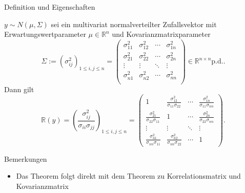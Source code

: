 \documentclass[
  8pt,
  ignorenonframetext,
]{beamer}
\providecommand{\tightlist}{%
  \setlength{\itemsep}{0pt}\setlength{\parskip}{0pt}}
\begin{document}
\begin{frame}{Definition und Eigenschaften}
\protect\hypertarget{definition-und-eigenschaften-4}{}
\footnotesize
\begin{theorem}
\justifying
\normalfont
$y \sim N(\mu,\Sigma)$ sei ein multivariat normalverteilter Zufallsvektor mit
Erwartungswertparameter $\mu \in \mathbb{R}^n$ und Kovarianzmatrixparameter
\begin{equation}
\Sigma
:= \left(\sigma_{ij}^2\right)_{1 \le i,j \le n}
=
\begin{pmatrix}
\sigma_{11}^2  & \sigma_{12}^2  & \cdots &  \sigma_{1n}^2 \\
\sigma_{21}^2  & \sigma_{22}^2  & \cdots &  \sigma_{2n}^2 \\
\vdots         & \vdots         & \ddots &  \vdots        \\
\sigma_{n1}^2  & \sigma_{n2}^2  & \cdots &  \sigma_{nn}^2 \\
\end{pmatrix}
\in \mathbb{R}^{n \times n}\mbox{p.d.}.
\end{equation}
Dann gilt
\begin{equation}
\renewcommand{\arraystretch}{1.5}
\mathbb{R}(y)
= \left(\frac{\sigma_{ij}^2}{\sigma_{ii}\sigma_{jj}}\right)_{1 \le i,j \le n}
=
\begin{pmatrix}
1
& \frac{\sigma_{12}^2}{\sigma_{11}\sigma_{22}}
& \cdots
& \frac{\sigma_{1n}^2}{\sigma_{11}\sigma_{nn}}
\\
  \frac{\sigma_{21}^2}{\sigma_{22}\sigma_{11}}
&  1
& \cdots
& \frac{\sigma_{2n}^2}{\sigma_{22}\sigma_{nn}}
\\
\vdots
& \vdots
& \ddots
& \vdots
\\
  \frac{\sigma_{n1}^2}{\sigma_{nn}\sigma_{11}}
& \frac{\sigma_{n2}^2}{\sigma_{nn}\sigma_{22}}
& \cdots
& 1
\end{pmatrix}.
\end{equation}
\end{theorem}

Bemerkungen

\begin{itemize}
\tightlist
\item
  Das Theorem folgt direkt mit dem Theorem zu Korrelationsmatrix und
  Kovarianzmatrix
\end{itemize}
\end{frame}
\end{document}

